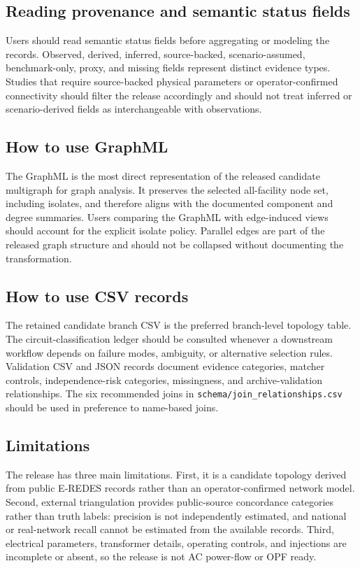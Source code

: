 \documentclass[10pt]{article}
\newcommand{\code}[1]{\texttt{#1}}
\begin{document}
\subsection{Reading provenance and semantic status fields}

Users should read semantic status fields before aggregating or modeling the records. Observed, derived, inferred, source-backed, scenario-assumed, benchmark-only, proxy, and missing fields represent distinct evidence types. Studies that require source-backed physical parameters or operator-confirmed connectivity should filter the release accordingly and should not treat inferred or scenario-derived fields as interchangeable with observations.

\subsection{How to use GraphML}

The GraphML is the most direct representation of the released candidate multigraph for graph analysis. It preserves the selected all-facility node set, including isolates, and therefore aligns with the documented component and degree summaries. Users comparing the GraphML with edge-induced views should account for the explicit isolate policy. Parallel edges are part of the released graph structure and should not be collapsed without documenting the transformation.

\subsection{How to use CSV records}

The retained candidate branch CSV is the preferred branch-level topology table. The circuit-classification ledger should be consulted whenever a downstream workflow depends on failure modes, ambiguity, or alternative selection rules. Validation CSV and JSON records document evidence categories, matcher controls, independence-risk categories, missingness, and archive-validation relationships. The six recommended joins in \code{schema/join\_relationships.csv} should be used in preference to name-based joins.

\subsection{Limitations}

The release has three main limitations. First, it is a candidate topology derived from public E-REDES records rather than an operator-confirmed network model. Second, external triangulation provides public-source concordance categories rather than truth labels: precision is not independently estimated, and national or real-network recall cannot be estimated from the available records. Third, electrical parameters, transformer details, operating controls, and injections are incomplete or absent, so the release is not AC power-flow or OPF ready.
\end{document}
